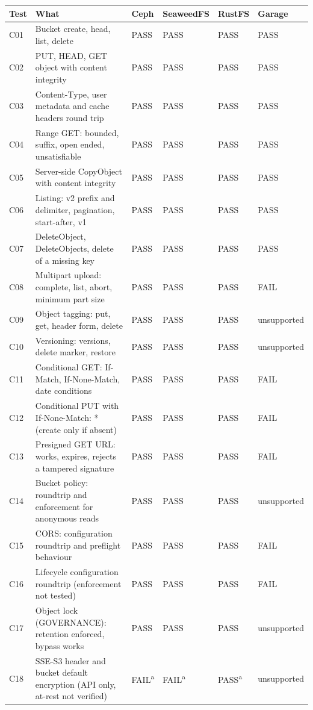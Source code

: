 \begin{tabular}{@{}llllll@{}}
\toprule
Test & What & Ceph & SeaweedFS & RustFS & Garage \\
\midrule
C01 & Bucket create, head, list, delete & PASS & PASS & PASS & PASS \\
C02 & PUT, HEAD, GET object with content integrity & PASS & PASS & PASS & PASS \\
C03 & Content-Type, user metadata and cache headers round trip & PASS & PASS & PASS & PASS \\
C04 & Range GET: bounded, suffix, open ended, unsatisfiable & PASS & PASS & PASS & PASS \\
C05 & Server-side CopyObject with content integrity & PASS & PASS & PASS & PASS \\
C06 & Listing: v2 prefix and delimiter, pagination, start-after, v1 & PASS & PASS & PASS & PASS \\
C07 & DeleteObject, DeleteObjects, delete of a missing key & PASS & PASS & PASS & PASS \\
C08 & Multipart upload: complete, list, abort, minimum part size & PASS & PASS & PASS & FAIL \\
C09 & Object tagging: put, get, header form, delete & PASS & PASS & PASS & unsupported \\
C10 & Versioning: versions, delete marker, restore & PASS & PASS & PASS & unsupported \\
C11 & Conditional GET: If-Match, If-None-Match, date conditions & PASS & PASS & PASS & FAIL \\
C12 & Conditional PUT with If-None-Match: * (create only if absent) & PASS & PASS & PASS & FAIL \\
C13 & Presigned GET URL: works, expires, rejects a tampered signature & PASS & PASS & PASS & FAIL \\
C14 & Bucket policy: roundtrip and enforcement for anonymous reads & PASS & PASS & PASS & unsupported \\
C15 & CORS: configuration roundtrip and preflight behaviour & PASS & PASS & PASS & FAIL \\
C16 & Lifecycle configuration roundtrip (enforcement not tested) & PASS & PASS & PASS & FAIL \\
C17 & Object lock (GOVERNANCE): retention enforced, bypass works & PASS & PASS & PASS & unsupported \\
C18 & SSE-S3 header and bucket default encryption (API only, at-rest not verified) & FAIL\textsuperscript{a} & FAIL\textsuperscript{a} & PASS\textsuperscript{a} & unsupported \\

\end{tabular}
